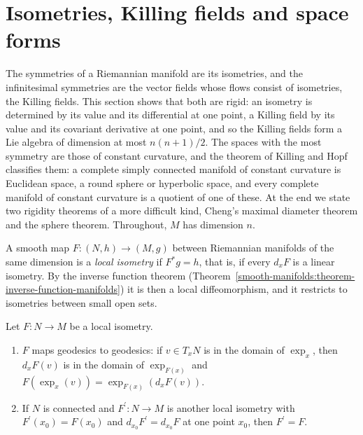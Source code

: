 \section{Isometries, Killing fields and space forms}\label{riemannian-geometry:section-killing}

The symmetries of a Riemannian manifold are its isometries, and the infinitesimal symmetries are the vector fields whose flows consist of isometries, the Killing
fields. This section shows that both are rigid: an isometry is determined by its value and its differential at one point, a Killing field by its value and its
covariant derivative at one point, and so the Killing fields form a Lie algebra of dimension at most $n(n + 1)/2$. The spaces with the most symmetry are those of
constant curvature, and the theorem of Killing and Hopf classifies them: a complete simply connected manifold of constant curvature is Euclidean space, a round
sphere or hyperbolic space, and every complete manifold of constant curvature is a quotient of one of these. At the end we state two rigidity theorems of a more
difficult kind, Cheng's maximal diameter theorem and the sphere theorem. Throughout, $M$ has dimension $n$.

A smooth map $F \colon (N, h) \to (M, g)$ between Riemannian manifolds of the same dimension is a \emph{local isometry} if $F^*g = h$, that is, if every
$d_xF$ is a linear isometry. By the inverse function theorem (Theorem~\ref{smooth-manifolds:theorem-inverse-function-manifolds}) it is then a local diffeomorphism,
and it restricts to isometries between small open sets.

\begin{lemma}\label{riemannian-geometry:lemma-local-isometries}
Let $F \colon N \to M$ be a local isometry.
\begin{enumerate}
\item $F$ maps geodesics to geodesics: if $v \in T_xN$ is in the domain of $\exp_x$, then $d_xF(v)$ is in the domain of $\exp_{F(x)}$ and
$F(\exp_x(v)) = \exp_{F(x)}(d_xF(v))$.
\item If $N$ is connected and $F^{\prime} \colon N \to M$ is another local isometry with $F^{\prime}(x_0) = F(x_0)$ and $d_{x_0}F^{\prime} = d_{x_0}F$ at one point $x_0$, then
$F^{\prime} = F$.
\end{enumerate}
\end{lemma}

